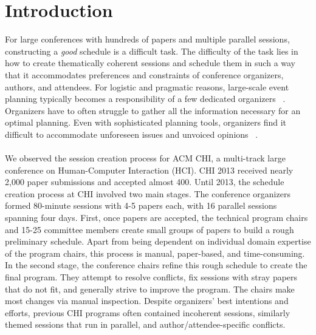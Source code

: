 \documentclass[letterpaper]{article}
\begin{document}
\section{Introduction}
For large conferences with hundreds of papers and multiple parallel sessions, constructing a \emph{good} schedule is a difficult task. The difficulty of the task lies in how to create thematically coherent sessions and schedule them in such a way that it accommodates preferences and constraints of conference organizers, authors, and attendees. For logistic and pragmatic reasons, large-scale event planning typically becomes a responsibility of a few dedicated organizers ~\cite{EventPlanning}. Organizers have to often struggle to gather all the information necessary for an optimal planning. Even with sophisticated planning tools, organizers find it difficult to accommodate unforeseen issues and unvoiced opinions ~\cite{CoDesign}.
\\
\\
We observed the session creation process for ACM CHI, a multi-track large conference on Human-Computer Interaction (HCI). CHI 2013 received nearly 2,000 paper submissions and accepted almost 400. Until 2013, the schedule creation process at CHI involved two main stages. The conference organizers formed 80-minute sessions with 4-5 papers each, with 16 parallel sessions spanning four days. First, once papers are accepted, the technical program chairs and 15-25 committee members create small groups of papers to build a rough preliminary schedule. Apart from being dependent on individual domain expertise of the program chairs, this process is manual, paper-based, and time-consuming. In the second stage, the conference chairs refine this rough schedule to create the final program. They attempt to resolve conflicts, fix sessions with stray papers that do not fit, and generally strive to improve the program. The chairs make most changes via manual inspection. Despite organizers' best intentions and efforts, previous CHI programs often contained incoherent sessions, similarly themed sessions that run in parallel, and author/attendee-specific conflicts.
\\
\\
\end{document}
